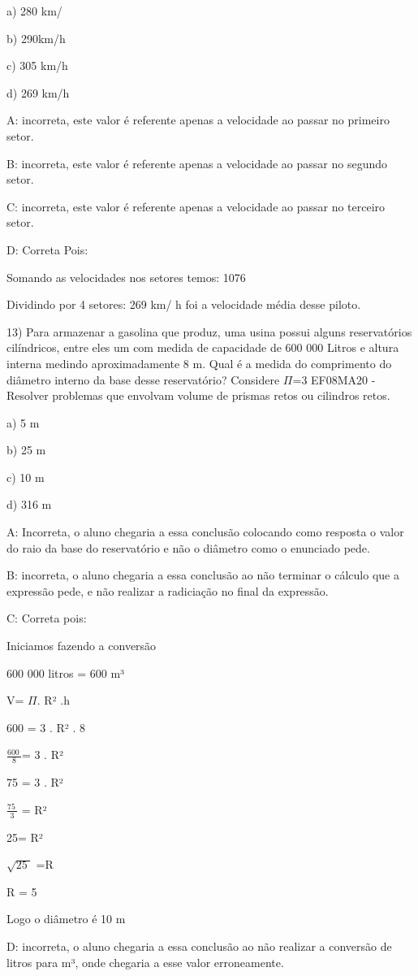 {a) 280 km/

b) 290km/h

c) 305 km/h

d) 269 km/h

A: incorreta, este valor é referente apenas a velocidade ao passar no
primeiro setor.

B: incorreta, este valor é referente apenas a velocidade ao passar no
segundo setor.

C: incorreta, este valor é referente apenas a velocidade ao passar no
terceiro setor.

D: Correta Pois:

Somando as velocidades nos setores temos: 1076

Dividindo por 4 setores: 269 km/ h foi a velocidade média desse piloto.

13) Para armazenar a gasolina que produz, uma usina possui alguns
reservatórios cilíndricos, entre eles um com medida de capacidade de 600
000 Litros e altura interna medindo aproximadamente 8 m. Qual é a medida
do comprimento do diâmetro interno da base desse reservatório? Considere
\(\Pi\)=3 EF08MA20 - Resolver problemas que envolvam volume de prismas
retos ou cilindros retos.

a) 5 m

b) 25 m

c) 10 m

d) 316 m

A: Incorreta, o aluno chegaria a essa conclusão colocando como resposta
o valor do raio da base do reservatório e não o diâmetro como o
enunciado pede.

B: incorreta, o aluno chegaria a essa conclusão ao não terminar o
cálculo que a expressão pede, e não realizar a radiciação no final da
expressão.

C: Correta pois:

Iniciamos fazendo a conversão

600 000 litros = 600 m³

V= \(\Pi\). R² .h

600 = 3 . R² . 8

\(\frac{600\ }{8}\)= 3 . R²

75 = 3 . R²

\(\frac{75\ }{3}\) = R²

25= R²

\(\sqrt{25\ }\) =R

R = 5

Logo o diâmetro é 10 m

D: incorreta, o aluno chegaria a essa conclusão ao não realizar a
conversão de litros para m³, onde chegaria a esse valor erroneamente.

}
